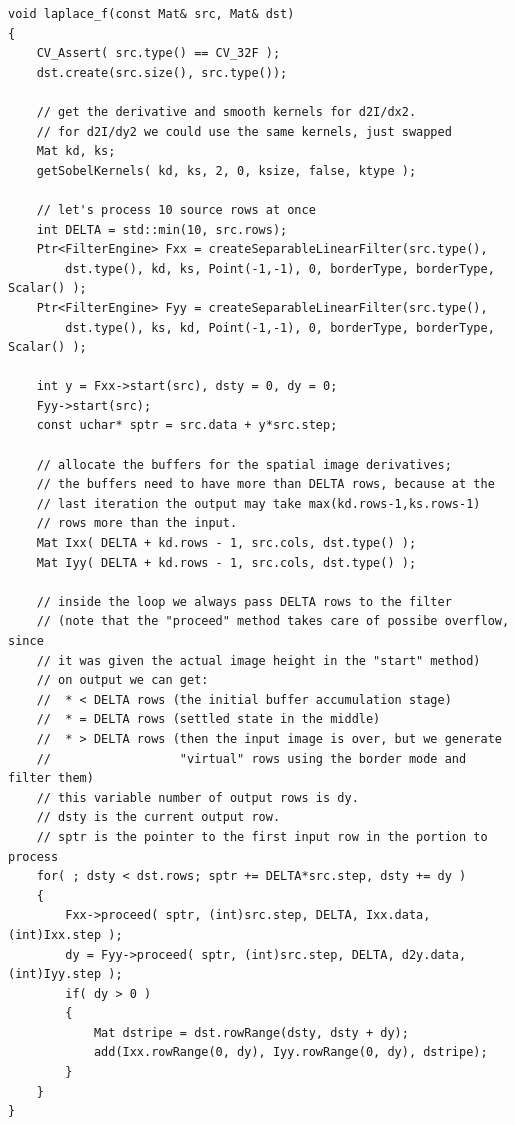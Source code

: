 \begin{lstlisting}
void laplace_f(const Mat& src, Mat& dst)
{
    CV_Assert( src.type() == CV_32F );
    dst.create(src.size(), src.type());
    
    // get the derivative and smooth kernels for d2I/dx2.
    // for d2I/dy2 we could use the same kernels, just swapped
    Mat kd, ks;
    getSobelKernels( kd, ks, 2, 0, ksize, false, ktype );
    
    // let's process 10 source rows at once
    int DELTA = std::min(10, src.rows);
    Ptr<FilterEngine> Fxx = createSeparableLinearFilter(src.type(),
        dst.type(), kd, ks, Point(-1,-1), 0, borderType, borderType, Scalar() ); 
    Ptr<FilterEngine> Fyy = createSeparableLinearFilter(src.type(),
        dst.type(), ks, kd, Point(-1,-1), 0, borderType, borderType, Scalar() );

    int y = Fxx->start(src), dsty = 0, dy = 0;
    Fyy->start(src);
    const uchar* sptr = src.data + y*src.step;

    // allocate the buffers for the spatial image derivatives;
    // the buffers need to have more than DELTA rows, because at the
    // last iteration the output may take max(kd.rows-1,ks.rows-1)
    // rows more than the input.
    Mat Ixx( DELTA + kd.rows - 1, src.cols, dst.type() );
    Mat Iyy( DELTA + kd.rows - 1, src.cols, dst.type() );
    
    // inside the loop we always pass DELTA rows to the filter
    // (note that the "proceed" method takes care of possibe overflow, since
    // it was given the actual image height in the "start" method)
    // on output we can get:
    //  * < DELTA rows (the initial buffer accumulation stage)
    //  * = DELTA rows (settled state in the middle)
    //  * > DELTA rows (then the input image is over, but we generate
    //                  "virtual" rows using the border mode and filter them)
    // this variable number of output rows is dy.
    // dsty is the current output row.
    // sptr is the pointer to the first input row in the portion to process
    for( ; dsty < dst.rows; sptr += DELTA*src.step, dsty += dy )
    {
        Fxx->proceed( sptr, (int)src.step, DELTA, Ixx.data, (int)Ixx.step );
        dy = Fyy->proceed( sptr, (int)src.step, DELTA, d2y.data, (int)Iyy.step );
        if( dy > 0 )
        {
            Mat dstripe = dst.rowRange(dsty, dsty + dy);
            add(Ixx.rowRange(0, dy), Iyy.rowRange(0, dy), dstripe);
        }
    }
}
\end{lstlisting}

